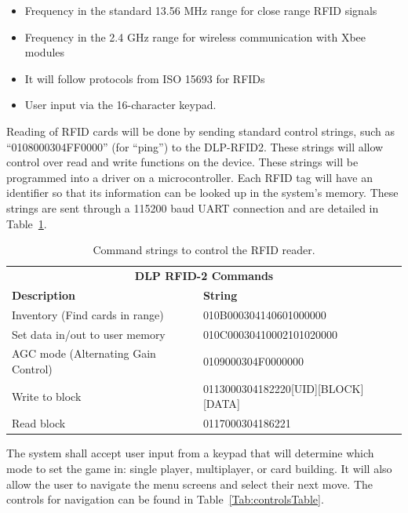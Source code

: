 \documentclass[12pt]{article} %
\begin{document}
\begin{itemize}
	\item Frequency in the standard 13.56 MHz range for close range RFID signals
	\item Frequency in the 2.4 GHz range for wireless communication with Xbee modules
	\item It will follow protocols from ISO 15693 for RFIDs
	\item User input via the 16-character keypad.
\end{itemize}

Reading of RFID cards will be done by sending standard control strings, such as “0108000304FF0000” (for “ping”) to the DLP-RFID2.  These strings will allow control over read and write functions on the device.  These strings will be programmed into a driver on a microcontroller.  Each RFID tag will have an identifier so that its information can be looked up in the system’s memory.   These strings are sent through a 115200 baud UART connection and are detailed in Table~\ref{Tab:DLP RFID-2 input commands}.

\begin{table}[h]
	\begin{tabular}{ll}
		\multicolumn{2}{c}{\textbf{DLP RFID-2 Commands}}                                     \\
		\textbf{Description}                & \textbf{String}                                \\
		Inventory (Find cards in range)     & 010B000304140601000000                         \\
		Set data in/out to user memory      & 010C00030410002101020000                       \\
		AGC mode (Alternating Gain Control) & 0109000304F0000000                             \\
		Write to block                      & 0113000304182220{[}UID{]}{[}BLOCK{]}{[}DATA{]} \\
		Read block                          & 0117000304186221                              
	\end{tabular}
	\caption{Command strings to control the RFID reader.}
	\label{Tab:DLP RFID-2 input commands}
\end{table}

The system shall accept user input from a keypad that will determine which mode to set the game in: single player, multiplayer, or card building. It will also allow the user to navigate the menu screens and select their next move. The controls for navigation can be found in Table~\ref{Tab:controlsTable}.
\end{document}
